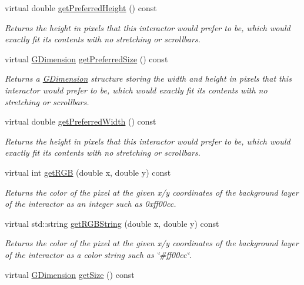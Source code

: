 \begin{DoxyCompactItemize}
virtual double \mbox{\hyperlink{classGInteractor_a747de0961653847bdc6615dbf756d715}{get\+Preferred\+Height}} () const
\begin{DoxyCompactList}\small\item\em Returns the height in pixels that this interactor would prefer to be, which would exactly fit its contents with no stretching or scrollbars. \end{DoxyCompactList}\item 
virtual \mbox{\hyperlink{classGDimension}{G\+Dimension}} \mbox{\hyperlink{classGInteractor_a4aabbee761d8e9116275401131b7ccd1}{get\+Preferred\+Size}} () const
\begin{DoxyCompactList}\small\item\em Returns a \mbox{\hyperlink{classGDimension}{G\+Dimension}} structure storing the width and height in pixels that this interactor would prefer to be, which would exactly fit its contents with no stretching or scrollbars. \end{DoxyCompactList}\item 
virtual double \mbox{\hyperlink{classGInteractor_a82bca31d37700fb0e35d2743352efd5e}{get\+Preferred\+Width}} () const
\begin{DoxyCompactList}\small\item\em Returns the height in pixels that this interactor would prefer to be, which would exactly fit its contents with no stretching or scrollbars. \end{DoxyCompactList}\item 
virtual int \mbox{\hyperlink{classGDrawingSurface_a9e983467cf0c97cfd62433a8471570dc}{get\+R\+GB}} (double x, double y) const
\begin{DoxyCompactList}\small\item\em Returns the color of the pixel at the given x/y coordinates of the background layer of the interactor as an integer such as 0xff00cc. \end{DoxyCompactList}\item 
virtual std\+::string \mbox{\hyperlink{classGDrawingSurface_a456d3582acc3544f37d939f5cb8802fe}{get\+R\+G\+B\+String}} (double x, double y) const
\begin{DoxyCompactList}\small\item\em Returns the color of the pixel at the given x/y coordinates of the background layer of the interactor as a color string such as \char`\"{}\#ff00cc\char`\"{}. \end{DoxyCompactList}\item 
virtual \mbox{\hyperlink{classGDimension}{G\+Dimension}} \mbox{\hyperlink{classGInteractor_a7b4eec96a2bdc6420695d5796a78eea9}{get\+Size}} () const

\end{DoxyCompactItemize}

